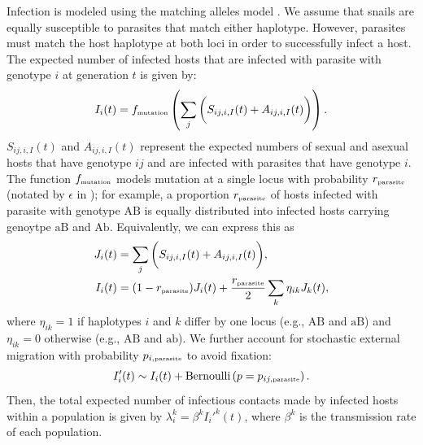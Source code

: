 \documentclass{article}\usepackage[]{graphicx}\usepackage[]{color}
\begin{document}
Infection is modeled using the matching alleles model \citep{hamilton1980sex,frank1997recognition,otto1998evolution}.
We assume that snails are equally susceptible to parasites that match either haplotype.
However, parasites must match the host haplotype at both loci in order to successfully infect a host.
The expected number of infected hosts that are infected with parasite with genotype $i$ at generation $t$ is given by:
\begin{equation}
I_{i}(t) = f_{\textrm{\tiny mutation}} \left( \sum_{j}  \bigg( S_{ij,i,I}(t) + A_{ij,i,I}(t)\bigg)\right).
\end{equation}
$S_{ij,i,I}(t)$ and $A_{ij,i,I}(t)$ represent the expected numbers of sexual and asexual hosts that have genotype $ij$ and are infected with parasites that have genotype $i$.
The function $f_{\textrm{\tiny mutation}}$ models mutation at a single locus with probability $r_{\textrm{\tiny parasite}}$ (notated by $\epsilon$ in \cite{ashby2015diversity});
for example, a proportion $r_{\textrm{\tiny parasite}}$ of hosts infected with parasite with genotype $\mathrm{AB}$ is equally distributed into infected hosts carrying genoytpe $\mathrm{aB}$ and $\mathrm{Ab}$.
Equivalently, we can express this as
\begin{equation}
\begin{aligned}
J_{i}(t) &= \sum_{j}  \bigg( S_{ij,i,I}(t) + A_{ij,i,I}(t)\bigg),\\
I_{i}(t) &= (1-r_{\textrm{\tiny parasite}}) J_i(t) + \frac{r_{\textrm{\tiny parasite}}}{2} \sum_{k} \eta_{ik} J_k(t),  \\
\end{aligned}
\end{equation}
where $\eta_{ik}=1$ if haplotypes $i$ and $k$ differ by one locus (e.g., $\mathrm{AB}$ and $\mathrm{aB}$) and $\eta_{ik}=0$ otherwise (e.g., $\mathrm{AB}$ and $\mathrm{ab}$).
We further account for stochastic external migration with probability $p_{i, \textrm{\tiny parasite}}$ to avoid fixation:
\begin{equation}
I_{i}'(t) \sim I_i(t) + \mathrm{Bernoulli}\left(p=p_{ij, \textrm{\tiny parasite}}\right).
\end{equation}
Then, the total expected number of infectious contacts made by infected hosts within a population is given by $\lambda_i^k = \beta^k {I_i'}^k(t)$, where $\beta^k$ is the transmission rate of each population. 
\end{document}

